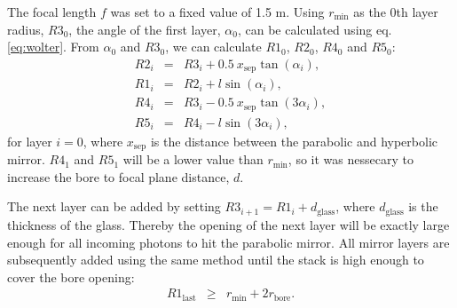 The focal length $f$ was set to a fixed value of 1.5 m. Using $r_{\text{min}}$ as the 0th layer radius, $\mathit{R3}_0$, the angle of the first layer, $\alpha_0$, can be calculated using eq. \ref{eq:wolter}. From $\alpha_0$ and $\mathit{R3}_0$, we can calculate $\mathit{R1}_0$, $\mathit{R2}_0$, $\mathit{R4}_0$ and \ensuremath{\mathit{R5}_0}:
\begin{eqnarray}
  \mathit{R2}_i &=& \mathit{R3}_i + 0.5\ x_{\text{sep}}\tan(\alpha_i),\\
  \mathit{R1}_i &=& \mathit{R2}_i + l\sin(\alpha_i),\\
  \mathit{R4}_i &=& \mathit{R3}_i - 0.5\ x_{\text{sep}}\tan(3\alpha_i),\\
  \mathit{R5}_i &=& \mathit{R4}_i - l\sin(3\alpha_i),
\end{eqnarray}
for layer $i=0$, where $x_{\text{sep}}$ is the distance between the parabolic and hyperbolic mirror. $\mathit{R4}_1$ and $\mathit{R5}_1$ will be a lower value than $r_{\text{min}}$, so it was nessecary to increase the bore to focal plane distance, $d$.

The next layer can be added by setting $\mathit{R3}_{i+1} = \mathit{R1}_i + d_{\text{glass}}$, where $d_{\text{glass}}$ is the thickness of the glass. Thereby the opening of the next layer will be exactly large enough for all incoming photons to hit the parabolic mirror. All mirror layers are subsequently added using the same method until the stack is high enough to cover the bore opening:
\begin{eqnarray}
  \mathit{R1}_{\text{last}} &\geq& r_{\text{min}} + 2r_{\text{bore}}.
\end{eqnarray}

